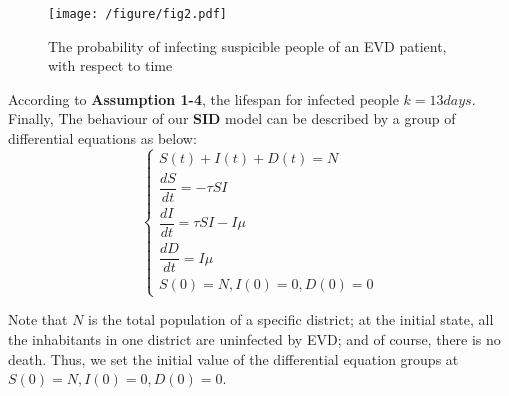 \begin{figure}[htbp]
\centering
\texttt{[image: /figure/fig2.pdf]}
\caption{The probability of infecting suspicible people of an EVD patient, with respect to time}\label{fig:2}
\end{figure}
According to \textbf{Assumption 1-4}, the lifespan for infected people $k=13 days$. 
Finally, The behaviour of our \textbf{SID} model can be described by a group of differential equations as below:
\begin{equation}
 \left\{
\begin{aligned}
S\left( t\right) +I\left( t\right) +D\left( t\right) =N \\
\dfrac {dS}{dt}=-\tau SI \\
\dfrac {dI}{dt}=\tau SI-I\mu \\
\dfrac {dD}{dt}=I\mu \\
S(0)=N, I(0)=0, D(0)=0
\end{aligned}
\right.
\end{equation}

Note that $N$ is the total population of a specific district; at the initial state, all the  inhabitants in one district are uninfected by EVD; and of course, there is no death. Thus, we set the initial value of the differential equation groups at $S(0)=N, I(0)=0, D(0)=0$.

